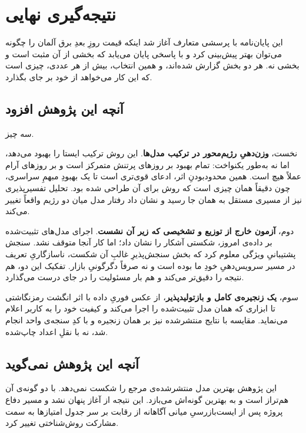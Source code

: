 
\section{نتیجه‌گیری نهایی}
\label{sec:5-5}

این پایان‌نامه با پرسشی متعارف آغاز شد  اینکه قیمت روزِ بعدِ برق آلمان را
چگونه می‌توان بهتر پیش‌بینی کرد  و با پاسخی پایان می‌یابد که بخشی از آن
مثبت است و بخشی نه. هر دو بخش گزارش شده‌اند، و همین انتخاب، بیش از هر عددی،
چیزی است که این کار می‌خواهد از خود بر جای بگذارد.

\subsection*{آنچه این پژوهش افزود}

سه چیز.

نخست، \textbf{وزن‌دهیِ رژیم‌محور در ترکیب مدل‌ها}. این روش ترکیب ایستا را بهبود
می‌دهد، اما نه به‌طور یکنواخت: تمام بهبود بر روزهای پرتنش متمرکز است و بر
روزهای آرام عملاً هیچ است. همین محدودبودنِ اثر، ادعای قوی‌تری است تا یک بهبودِ
مبهمِ سراسری، چون دقیقاً همان چیزی است که روش برای آن طراحی شده بود. تحلیل
تفسیرپذیری نیز از مسیری مستقل به همان جا رسید و نشان داد رفتار مدل میان دو
رژیم واقعاً تغییر می‌کند.

دوم، \textbf{آزمون خارج از توزیع و تشخیصی که زیر آن نشست}. اجرای مدل‌های
تثبیت‌شده بر داده‌ی امروز، شکستی آشکار را نشان داد؛ اما کار آنجا متوقف نشد.
سنجش پشتیبانیِ ویژگی معلوم کرد که بخش سنجش‌پذیرِ غالبِ آن شکست، ناسازگاریِ
تعریف در مسیر سرویس‌دهیِ خودِ ما بوده است و نه صرفاً دگرگونیِ بازار. تفکیک این
دو، هم نتیجه را دقیق‌تر می‌کند و هم بار مسئولیت را در جای درست می‌گذارد.

سوم، \textbf{یک زنجیره‌ی کامل و بازتولیدپذیر}، از عکس فوریِ داده با اثر انگشت
رمزنگاشتی تا ابزاری که همان مدل تثبیت‌شده را اجرا می‌کند و کیفیت خود را به
کاربر اعلام می‌نماید. مقایسه با نتایج منتشرشده نیز بر همان زنجیره و با کدِ
سنجه‌ی واحد انجام شد، نه با نقلِ اعداد چاپ‌شده.

\subsection*{آنچه این پژوهش نمی‌گوید}

این پژوهش بهترین مدل منتشرشده‌ی مرجع را شکست نمی‌دهد. با دو گونه‌ی آن هم‌تراز
است و به بهترین گونه‌اش می‌بازد. این نتیجه از آغاز پنهان نشد و مسیر دفاع پروژه
پس از ایست‌بازرسیِ میانی آگاهانه از رقابت بر سر جدول امتیازها به سمت مشارکت
روش‌شناختی تغییر کرد.


